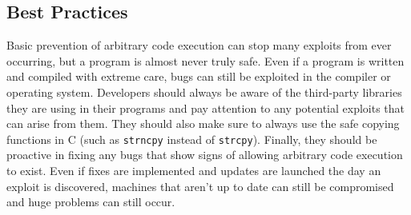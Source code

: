 \subsection{Best Practices}

Basic prevention of arbitrary code execution can stop many exploits from ever occurring, but a program is almost never truly safe. Even if a program is written and compiled with extreme care, bugs can still be exploited in the compiler or operating system. Developers should always be aware of the third-party libraries they are using in their programs and pay attention to any potential exploits that can arise from them. They should also make sure to always use the safe copying functions in C (such as \texttt{strncpy} instead of \texttt{strcpy}). Finally, they should be proactive in fixing any bugs that show signs of allowing arbitrary code execution to exist. Even if fixes are implemented and updates are launched the day an exploit is discovered, machines that aren't up to date can still be compromised and huge problems can still occur.
